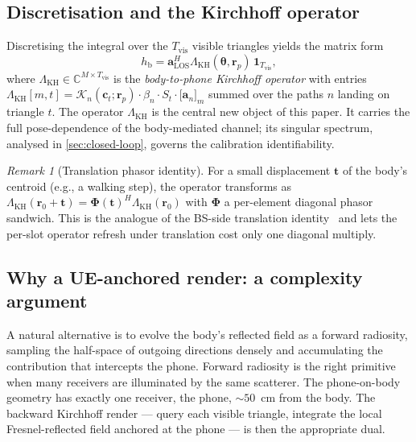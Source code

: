 \documentclass[journal,twocolumn,10pt]{IEEEtran}
\theoremstyle{plain}
\theoremstyle{definition}
\theoremstyle{remark}
\newtheorem{remark}[theorem]{Remark}
\newcommand{\rr}{\mathbf{r}}
\newcommand{\Phimat}{\mathbf{\Phi}}
\newcommand{\thetab}{\bm{\theta}}
\newcommand{\hbody}{h_{\mathrm{b}}}
\newcommand{\Complex}{\mathbb{C}}
\begin{document}
\subsection{Discretisation and the Kirchhoff operator}

Discretising the integral over the $T_{\mathrm{vis}}$ visible
triangles yields the matrix form
\begin{equation}\label{eq:Lambda-op}
\hbody = \mathbf{a}_{\mathrm{LOS}}^{H}\Lambda_{\mathrm{KH}}(\thetab,\rr_p)\,
\bm{1}_{T_{\mathrm{vis}}},
\end{equation}
where $\Lambda_{\mathrm{KH}} \in \Complex^{M \times T_{\mathrm{vis}}}$
is the \emph{body-to-phone Kirchhoff operator} with entries
$\Lambda_{\mathrm{KH}}[m,t] = \mathcal{K}_n(\bm{c}_t;\rr_p) \cdot
\beta_n \cdot S_t \cdot \bigl[\bm{a}_n\bigr]_m$ summed over the
paths $n$ landing on triangle $t$. The operator $\Lambda_{\mathrm{KH}}$
is the central new object of this paper. It carries the full
pose-dependence of the body-mediated channel; its singular spectrum,
analysed in \cref{sec:closed-loop}, governs the calibration
identifiability.

\begin{remark}[Translation phasor identity]
For a small displacement $\bm{t}$ of the body's centroid (e.g., a
walking step), the operator transforms as $\Lambda_{\mathrm{KH}}(\rr_0
+ \bm{t}) = \Phimat(\bm{t})^{H}\Lambda_{\mathrm{KH}}(\rr_0)$ with
$\Phimat$ a per-element diagonal phasor sandwich. This is the
analogue of the BS-side translation
identity~\cite{Wydaeghe2026jsacv5} and lets the per-slot operator
refresh under translation cost only one diagonal multiply.
\end{remark}

\subsection{Why a UE-anchored render: a complexity argument}

A natural alternative is to evolve the body's reflected field as a
forward radiosity, sampling the half-space of outgoing directions
densely and accumulating the contribution that intercepts the phone.
Forward radiosity is the right primitive when many receivers are
illuminated by the same scatterer. The phone-on-body geometry has
exactly one receiver, the phone, $\sim\!50$~cm from the body. The
backward Kirchhoff render --- query each visible triangle, integrate
the local Fresnel-reflected field anchored at the phone --- is then
the appropriate dual.
\end{document}
